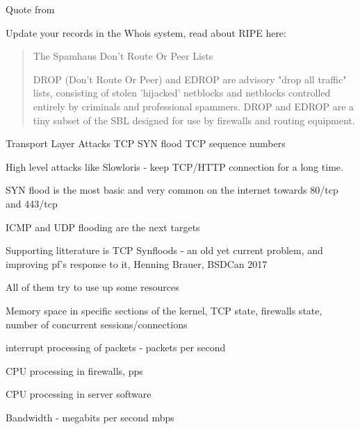 \documentclass[Screen16to9,17pt]{foils}
\begin{document}
\begin{list1}
\item Quote from {\small{}}
\item Update your records in the Whois system, read about RIPE here:\\ {\small{}}
\end{list1}



\begin{quote}
The Spamhaus Don't Route Or Peer Lists

DROP (Don't Route Or Peer) and EDROP are advisory "drop all traffic" lists, consisting of stolen 'hijacked' netblocks and netblocks controlled entirely by criminals and professional spammers. DROP and EDROP are a tiny subset of the SBL designed for use by firewalls and routing equipment.
\end{quote}





\begin{list2}
\item Transport Layer Attacks TCP SYN flood TCP sequence numbers
\item High level attacks like Slowloris - keep TCP/HTTP connection for a long time.
\end{list2}



\begin{list2}
\item SYN flood is the most basic and very common on the internet towards 80/tcp and 443/tcp
\item ICMP and UDP flooding are the next targets
\item Supporting litterature is TCP Synfloods - an old yet current problem, and improving pf's response to it, Henning Brauer, BSDCan 2017
\item All of them try to use up some resources
\begin{list2}
\item Memory space in specific sections of the kernel, TCP state, firewalls state, number of concurrent sessions/connections
\item interrupt processing of packets - packets per second
\item CPU processing in firewalls, pps
\item CPU processing in server software
\item Bandwidth - megabits per second mbps
\end{list2}
\end{list2}
\end{document}
